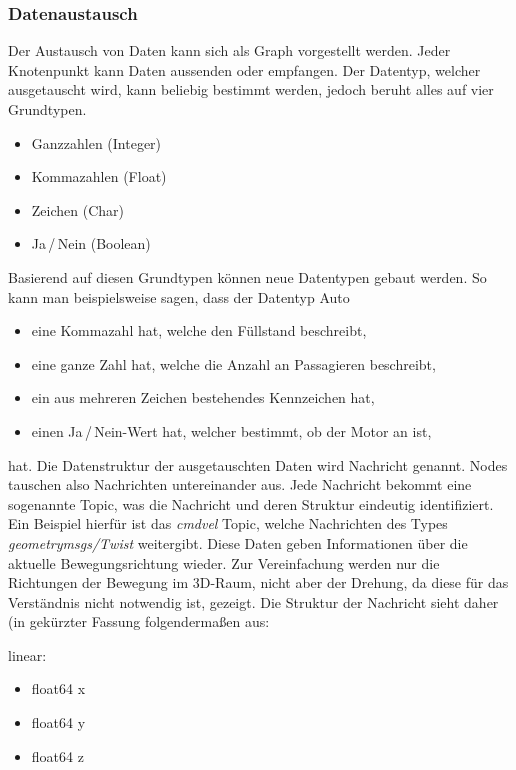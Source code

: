 {{		\subsubsection{Datenaustausch}
		{
			Der Austausch von Daten kann sich als Graph vorgestellt werden. Jeder Knotenpunkt kann Daten aussenden oder empfangen. Der Datentyp, welcher ausgetauscht wird, kann beliebig bestimmt werden, jedoch beruht alles auf vier Grundtypen.
			\begin{itemize}
				\item Ganzzahlen (Integer)
				\item Kommazahlen (Float)
				\item Zeichen (Char)
				\item Ja\,/\,Nein (Boolean)
			\end{itemize}
			Basierend auf diesen Grundtypen können neue Datentypen gebaut werden. So kann man beispielsweise sagen, dass der Datentyp Auto
			\begin{itemize}
				\item eine Kommazahl hat, welche den Füllstand beschreibt,
				\item eine ganze Zahl hat, welche die Anzahl an Passagieren beschreibt,
				\item ein aus mehreren Zeichen bestehendes Kennzeichen hat,
				\item einen Ja\,/\,Nein-Wert hat, welcher bestimmt, ob der Motor an ist,
			\end{itemize}
			
			hat. Die Datenstruktur der ausgetauschten Daten wird Nachricht genannt. Nodes tauschen also Nachrichten untereinander aus. Jede Nachricht bekommt eine sogenannte Topic, was die Nachricht und deren Struktur eindeutig identifiziert. Ein Beispiel hierfür ist das \emph{cmd\textunderscore vel} Topic, welche Nachrichten des Types \emph{geometry\textunderscore msgs/Twist} weitergibt. Diese Daten geben Informationen über die aktuelle Bewegungsrichtung wieder. Zur Vereinfachung werden nur die Richtungen der Bewegung im 3D-Raum, nicht aber der Drehung, da diese für das Verständnis nicht notwendig ist, gezeigt. Die Struktur der Nachricht sieht daher (in gekürzter Fassung folgendermaßen aus:
			\newline
			
			linear:
			\begin{itemize}
				\item float64 x
				\item float64 y
				\item float64 z
			\end{itemize}
			
}}}
